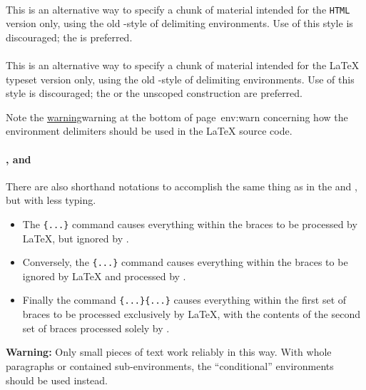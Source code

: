 \paragraph*{\label{endhtmlonly}}
This is an alternative way to specify a chunk of material intended
for the \texttt{HTML} version only,
using the old \AmS-style of delimiting environments.
Use of this style is discouraged; 
the   is preferred.%


%
\paragraph*{\label{endlatexonly}}
This is an alternative way to specify a chunk of material intended
for the \LaTeX{} typeset version only,
using the old \AmS-style of delimiting environments.
Use of this style is discouraged; 
the   or the unscoped 
construction are preferred.%

\smallskip\noindent
Note the \hyperref[page]{warning}{warning at the bottom of page~}{}{env:warn}
concerning how the environment delimiters should be used in the
\LaTeX{} source code.


%
%
%
\html{\\}%
\paragraph*{,  and \label{latexhtml}}
There are also shorthand notations to accomplish the same thing 
as in the   and  
, but with less typing.
\begin{itemize}
\item 
The \verb|{...}| command causes everything within the braces 
to be processed by \LaTeX, but ignored by \latextohtml.
\item  
Conversely, the \verb|{...}| command causes everything within the braces 
to be ignored by \LaTeX{} and processed by \latextohtml.  
\item  
Finally the command \verb|{...}{...}| causes everything 
within the first set of braces to be processed exclusively by \LaTeX, 
with the contents of the second set of braces processed solely by \latextohtml.%
\end{itemize}
\textbf{Warning: }
Only small pieces of text work reliably in this way. 
With whole paragraphs or contained sub-environments,
the ``conditional'' environments should be used instead.

